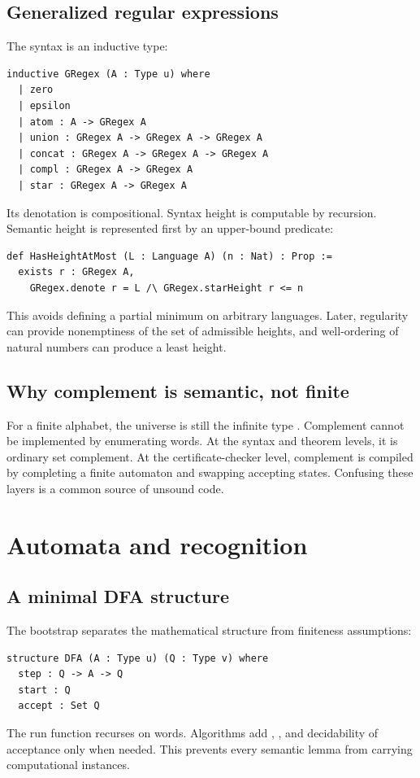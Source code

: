 \documentclass{amsart}
\begin{document}
\subsection{Generalized regular expressions}

The syntax is an inductive type:
\begin{lstlisting}[language={}]
inductive GRegex (A : Type u) where
  | zero
  | epsilon
  | atom : A -> GRegex A
  | union : GRegex A -> GRegex A -> GRegex A
  | concat : GRegex A -> GRegex A -> GRegex A
  | compl : GRegex A -> GRegex A
  | star : GRegex A -> GRegex A
\end{lstlisting}
Its denotation is compositional.  Syntax height is computable by recursion.  Semantic height is represented first by an upper-bound predicate:
\begin{lstlisting}[language={}]
def HasHeightAtMost (L : Language A) (n : Nat) : Prop :=
  exists r : GRegex A,
    GRegex.denote r = L /\ GRegex.starHeight r <= n
\end{lstlisting}
This avoids defining a partial minimum on arbitrary languages.  Later, regularity can provide nonemptiness of the set of admissible heights, and well-ordering of natural numbers can produce a least height.

\subsection{Why complement is semantic, not finite}

For a finite alphabet, the universe is still the infinite type .  Complement cannot be implemented by enumerating words.  At the syntax and theorem levels, it is ordinary set complement.  At the certificate-checker level, complement is compiled by completing a finite automaton and swapping accepting states.  Confusing these layers is a common source of unsound code.

\section{Automata and recognition}

\subsection{A minimal DFA structure}

The bootstrap separates the mathematical structure from finiteness assumptions:
\begin{lstlisting}[language={}]
structure DFA (A : Type u) (Q : Type v) where
  step : Q -> A -> Q
  start : Q
  accept : Set Q
\end{lstlisting}
The run function recurses on words.  Algorithms add , , and decidability of acceptance only when needed.  This prevents every semantic lemma from carrying computational instances.
\end{document}
